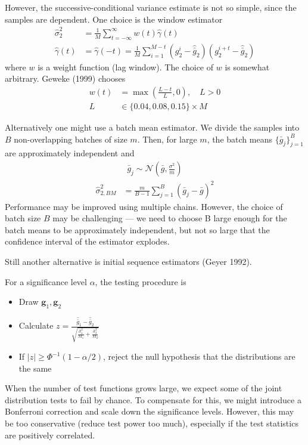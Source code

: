 \documentclass{article}
\begin{document}
However, the successive-conditional variance estimate is not so simple, since the samples are dependent. One choice is the window estimator
\begin{align*}
    \hat{\sigma}_{2}^{2} &= \frac{1}{M}\sum_{t=-\infty}^{\infty} w(t) \hat{\gamma}(t) \\
    \hat{\gamma}(t) &= \hat{\gamma}(-t) = \frac{1}{M}\sum_{i=1}^{M-t}(g_{2}^{i} - \hat{\bar{g}}_{2})(g_{2}^{i+t} - \hat{\bar{g}}_{2})
\end{align*}
where $w$ is a weight function (lag window). The choice of $w$ is somewhat arbitrary. Geweke (1999) chooses
\begin{align*}
    w(t) &= \max{\left(\frac{L-t}{L}, 0\right)}, \quad L > 0 \\
    L &\in \{0.04, 0.08, 0.15\} \times M
\end{align*}

Alternatively one might use a batch mean estimator. We divide the samples into $B$ non-overlapping batches of size $m$. Then, for large $m$, the batch means $\{\bar{g}_{j}\}_{j=1}^{B}$ are approximately independent and
\begin{align*}
    \bar{g}_{j} \sim \mathcal{N}(\bar{g}, \frac{\sigma^{2}}{m})
\end{align*}
\begin{align*}
    \hat{\sigma}_{2, BM}^{2} &= \frac{m}{B-1}\sum_{j=1}^{B} (\bar{g}_{j} - \bar{g})^{2}
\end{align*}
Performance may be improved using multiple chains. However, the choice of batch size $B$ may be challenging --- we need to choose B large enough for the batch means to be approximately independent, but not so large that the confidence interval of the estimator explodes.

Still another alternative is initial sequence estimators (Geyer 1992).

For a significance level $\alpha$, the testing procedure is
\begin{itemize}
    \item Draw $\mathbf{g}_{1}, \mathbf{g}_{2}$
    \item Calculate $z=\frac{\hat{\bar{g}}_{1} - \hat{\bar{g}}_{2}}{\sqrt{ \frac{\hat{\sigma}^{2}_{1}}{M_{1}} + \frac{\hat{\sigma}^{2}_{2}}{M_{2}}}}$
    \item If $|z| \geq \Phi^{-1}(1-\alpha/2)$, reject the null hypothesis that the distributions are the same
\end{itemize}

When the number of test functions grows large, we expect some of the joint distribution tests to fail by chance. To compensate for this, we might introduce a Bonferroni correction and scale down the significance levels. However, this may be too conservative (reduce test power too much), especially if the test statistics are positively correlated. 
\end{document}

